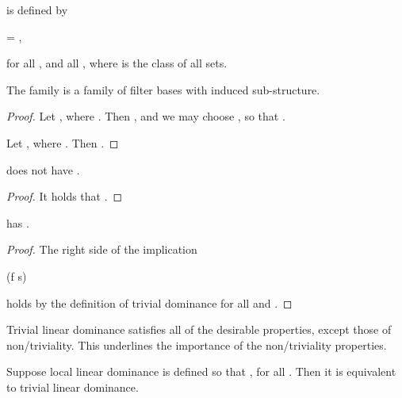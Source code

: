 \documentclass[b5paper, english, oneside]{memoir}
\begin{document}
\begin{definition}
  is defined by
\begin{eqs}
 = ,
\end{eqs}
for all , and all , where  is the class of all sets.
\end{definition}

\begin{theorem}
\label{TrivialLinearDominanceIsLocalLinearDominance}
The family  is a family of filter bases with induced sub-structure.
\end{theorem}

\begin{proof}
Let , where . Then , and we may choose , so that . 

Let , where . Then .  	
\end{proof}

\begin{theorem}
\label{TrivialOneSeparationFails}
 does not have .
\end{theorem}

\begin{proof}
It holds that .
\end{proof}

\begin{theorem}
\label{TrivialSubComposability}
 has .
\end{theorem}

\begin{proof}
The right side of the implication
\begin{eqs}
(f \circ s) \in {}
\end{eqs}
holds by the definition of trivial dominance for all  and .
\end{proof}

\begin{note}
Trivial linear dominance satisfies all of the desirable properties, except those of non\-/triviality. This underlines the importance of the non\-/triviality properties.
\end{note}

\begin{note}
Suppose local linear dominance is defined so that , for all . Then it is equivalent to trivial linear dominance.
\end{note}
\end{document}
